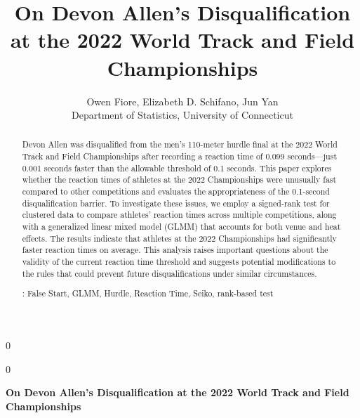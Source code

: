 \documentclass[12pt, letterpaper]{article}
\newcommand{\blind}{0}
\begin{document}

\blind
{
  \title{\bf On Devon Allen's Disqualification at the 2022 World Track and Field 
Championships}
  \author{Owen Fiore, %
  Elizabeth D. Schifano, %
  Jun Yan\\[1ex]
  Department of Statistics, University of Connecticut\\
}
\date{}
  \maketitle
} \fi

\blind
{
  \bigskip
  \bigskip
  \bigskip
  \begin{center}
  {\LARGE\bf On Devon Allen's Disqualification at the 2022 World Track and Field 
Championships}
\end{center}
  \bigskip
} \fi


\doublespace


\begin{abstract}
Devon Allen was disqualified from the men's 110-meter hurdle final at
the 2022 World Track and Field Championships after recording a
reaction time of 0.099 seconds—just 0.001 seconds faster than the
allowable threshold of 0.1 seconds. This paper explores whether the
reaction times of athletes at the 2022 Championships were unusually
fast compared to other competitions and evaluates the appropriateness
of the 0.1-second disqualification barrier. To investigate these
issues, we employ a signed-rank test for clustered data to compare
athletes' reaction times across multiple competitions, along with a
generalized linear mixed model (GLMM) that accounts for both venue and
heat effects. The results indicate that athletes at the 2022
Championships had significantly faster reaction times on average. This
analysis raises important questions about the validity of the current
reaction time threshold and suggests potential modifications to the
rules that could prevent future disqualifications under similar
circumstances.


\bigskip{}:
False Start, GLMM, Hurdle, Reaction Time, Seiko, rank-based test

\end{abstract}
\end{document}
